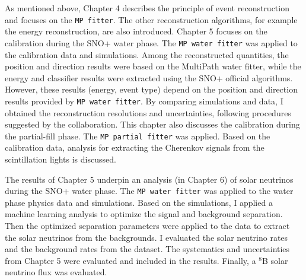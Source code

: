 As mentioned above, Chapter 4 describes the principle of event reconstruction and focuses on the \texttt{MP fitter}. The other reconstruction algorithms, for example the energy reconstruction, are also introduced. Chapter 5 focuses on the calibration during the SNO+ water phase. The \texttt{MP water fitter} was applied to the calibration data and simulations. Among the reconstructed quantities, the position and direction results were based on the MultiPath water fitter, while the energy and classifier results were extracted using the SNO+ official algorithms. However, these results (energy, event type) depend on the position and direction results provided by \texttt{MP water fitter}. By comparing simulations and data, I obtained the reconstruction resolutions and uncertainties, following procedures suggested by the collaboration. This chapter also discusses the calibration during the partial-fill phase. The \texttt{MP partial fitter} was applied. Based on the calibration data, analysis for extracting the Cherenkov signals from the scintillation lights is discussed.

The results of Chapter 5 underpin an analysis (in Chapter 6) of solar neutrinos during the SNO+ water phase. The \texttt{MP water fitter} was applied to the water phase physics data and simulations. Based on the simulations, I applied a machine learning analysis to optimize the signal and background separation. Then the optimized separation parameters were applied to the data to extract the solar neutrinos from the backgrounds. I evaluated the solar neutrino rates and the background rates from the dataset. The systematics and uncertainties from Chapter 5 were evaluated and included in the results. Finally, a $^8$B solar neutrino flux was evaluated.
